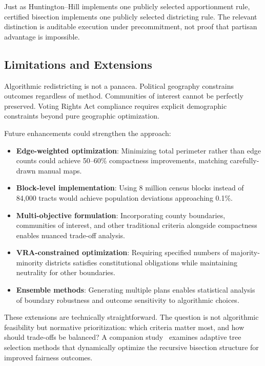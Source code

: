 Just as Huntington--Hill implements one publicly selected apportionment rule,
certified bisection implements one publicly selected districting rule. The
relevant distinction is auditable execution under precommitment, not proof that
partisan advantage is impossible.

\subsection{Limitations and Extensions}

Algorithmic redistricting is not a panacea. Political geography constrains outcomes regardless of method. Communities of interest cannot be perfectly preserved. Voting Rights Act compliance requires explicit demographic constraints beyond pure geographic optimization.

Future enhancements could strengthen the approach:

\begin{itemize}
    \item \textbf{Edge-weighted optimization}: Minimizing total perimeter rather than edge counts could achieve 50--60\% compactness improvements, matching carefully-drawn manual maps.
    \item \textbf{Block-level implementation}: Using 8 million census blocks instead of 84,000 tracts would achieve population deviations approaching 0.1\%.
    \item \textbf{Multi-objective formulation}: Incorporating county boundaries, communities of interest, and other traditional criteria alongside compactness enables nuanced trade-off analysis.
    \item \textbf{VRA-constrained optimization}: Requiring specified numbers of majority-minority districts satisfies constitutional obligations while maintaining neutrality for other boundaries.
    \item \textbf{Ensemble methods}: Generating multiple plans enables statistical analysis of boundary robustness and outcome sensitivity to algorithmic choices.
\end{itemize}

These extensions are technically straightforward. The question is not algorithmic feasibility but normative prioritization: which criteria matter most, and how should trade-offs be balanced? A companion study~\citep{dellaLibera2026adaptive} examines adaptive tree selection methods that dynamically optimize the recursive bisection structure for improved fairness outcomes.


